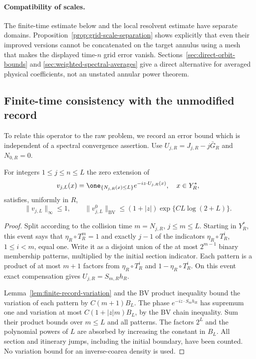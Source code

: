 \paragraph{Compatibility of scales.}
The finite-time estimate below and the local resolvent estimate have
separate domains. Proposition~\ref{prop:grid-scale-separation} shows
explicitly that even their improved versions cannot be concatenated
on the target annulus using a mesh that makes the displayed time-$n$
grid error vanish. Sections~\ref{sec:direct-orbit-bounds} and
\ref{sec:weighted-spectral-averages} give a direct alternative for
averaged physical coefficients, not an unstated annular power theorem.

\subsection{Finite-time consistency with the unmodified record}
To relate this operator to the raw problem, we record an error bound
which is independent of a spectral convergence assertion. Use
$U_{j,R}=J_{j,R}-j\bar G_R$ and $N_{0,R}=0$.

\begin{lemma}
\label{lem:truncated-return-phase-variation}
For integers $1\le j\le n\le L$ the zero extension of
\[
 v_{j,L}(x)=\one_{\{N_{j,R}(x)\le L\}}
                                  e^{-iz\cdot U_{j,R}(x)},\quad x\in Y_R^*,
\]
satisfies, uniformly in $R$,
\begin{equation}\label{eq:truncated-return-phase-variation}
 \|v_{j,L}\|_\infty\le1,\qquad
 \|v_{j,L}^0\|_{\mathrm{BV}}
                     \le(1+|z|)\exp\{C L\log(2+L)\}.
\end{equation}
\end{lemma}
\begin{proof}
Split according to the collision time $m=N_{j,R}$, $j\le m\le L$.
Starting in $Y_R^*$, this event says that
$\eta_R\circ T_R^m=1$ and exactly $j-1$ of the indicators
$\eta_R\circ T_R^i$, $1\le i<m$, equal one.
Write it as a disjoint union of the at most $2^{m-1}$ binary
membership patterns, multiplied by the initial section indicator.
Each pattern is a product of at most $m+1$ factors from
$\eta_R\circ T_R^i$ and $1-\eta_R\circ T_R^i$.
On this event exact compensation gives $U_{j,R}=S_{m,R}h_R$.

Lemma~\ref{lem:finite-record-variation} and the BV product inequality
bound the variation of each pattern by $C(m+1)B_L$. The phase
$e^{-iz\cdot S_mh_R}$ has supremum one and variation at most
$C(1+|z|m)B_L$, by the BV chain inequality. Sum their product bounds
over $m\le L$ and all patterns. The factors $2^L$ and the polynomial
powers of $L$ are absorbed by increasing the constant in $B_L$.
All section and itinerary jumps, including the initial boundary, have
been counted. No variation bound for an inverse-coarea density is
used.
\end{proof}


